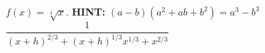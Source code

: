 {$f(x) = \sqrt[3]{x}$.  \textbf{HINT:}  $(a-b)\left(a^2+ab+b^2\right) = a^3 - b^3$}
{$\dfrac{1}{(x+h)^{2/3} + (x+h)^{1/3} x^{1/3} + x^{2/3}}$}